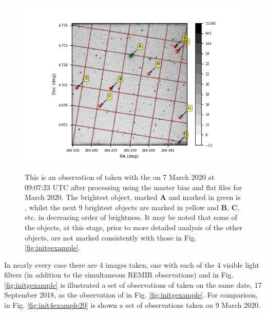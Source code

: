 \begin{figure}[!htbp]
\begin{center}
\includegraphics[scale=1]{images/initgexample20.png}
\end{center}
\caption{This is an observation of {\bstar} taken with the {\gfilter} on
7 March 2020 at 09:07:23 UTC after processing using the master bias and
flat files for March 2020. The brightest object, marked \textbf{A} and marked in
green is \bstar, whilst the next 9 brightest objects are marked in yellow and
\textbf{B}, \textbf{C}, etc. in decreasing order of brightness. It may be
noted that some of the objects, at this stage, prior to more detailed analysis
of the other objects, are not marked consistently with those in Fig. \ref{fig:initgexample}.}
\protect\label{fig:initgexample20}
\end{figure}

In nearly every case there are 4 images taken, one with each of the 4 visible
light filters (in addition to the simultaneous REMIR observations) and in Fig.
\ref{fig:initgexample} is illustrated a set of observations of {\prox} taken on
the same date, 17 September 2018, as the observation of {\bstar} in Fig.
\ref{fig:initgexample}. For comparison, in Fig. \ref{fig:init4example20} is
shown a set of observations taken on 9 March 2020.

